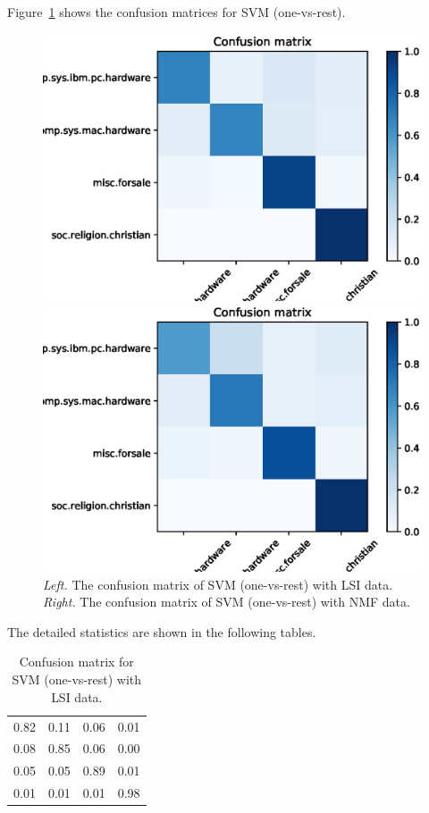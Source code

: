 \documentclass[letterpaper]{article}
\begin{document}
Figure~\ref{fig:svm-rest-2} shows the confusion matrices for SVM
(one-vs-rest).
\begin{figure}[!htb]
\centering
\begin{minipage}{0.5\textwidth}
\includegraphics[width=1.0\textwidth]{conf-mat-lsi-svm-rest}
\end{minipage}%
\begin{minipage}{0.5\textwidth}
\includegraphics[width=1.0\textwidth]{conf-mat-nmf-svm-rest}
\end{minipage}
\caption{\emph{Left.} The confusion matrix of SVM (one-vs-rest)
with LSI data.
\emph{Right.} The confusion matrix of SVM (one-vs-rest) with NMF data.}
\label{fig:svm-rest-2}
\end{figure}

The detailed statistics are shown in the following tables.
\begin{table}[H]
\centering
\begin{tabular}{cccc}
0.82 & 0.11 & 0.06 & 0.01 \\
0.08 & 0.85 & 0.06 & 0.00 \\
0.05 & 0.05 & 0.89 & 0.01 \\
0.01 & 0.01 & 0.01 & 0.98
\end{tabular}
\caption{Confusion matrix for SVM (one-vs-rest) with LSI data.}
\end{table}
\end{document}
